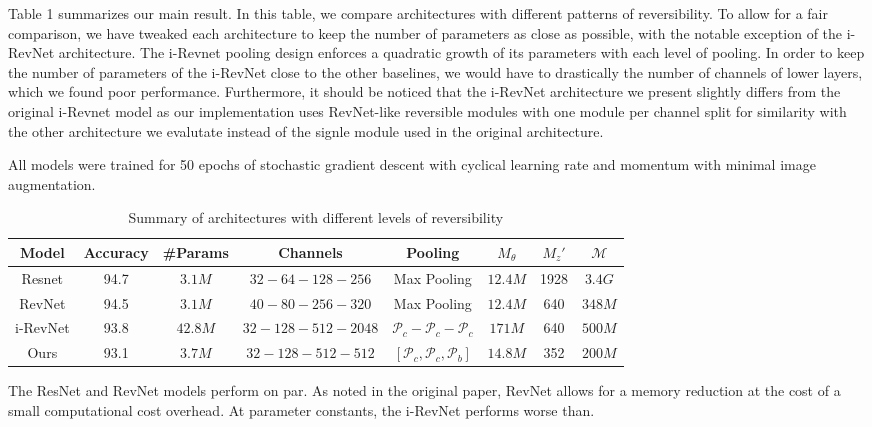 \documentclass[twocolumn]{bmcart}
\begin{document}
Table 1 summarizes our main result.
In this table, we compare architectures with different patterns of reversibility.
To allow for a fair comparison, we have tweaked each architecture to keep the number of parameters as close as possible,
with the notable exception of the i-RevNet architecture. 
The i-Revnet pooling design enforces a quadratic growth of its parameters with each level of pooling.
In order to keep the number of parameters of the i-RevNet close to the other baselines, we would have to drastically 
the number of channels of lower layers, which we found poor performance. 
Furthermore, it should be noticed that the i-RevNet architecture we present slightly differs from the original i-Revnet model
as our implementation uses RevNet-like reversible modules with one module per channel split for similarity with
the other architecture we evalutate instead of the signle module used in the original architecture.

All models were trained for 50 epochs of stochastic gradient descent with cyclical learning rate and momentum \cite{smith2017super} with minimal image augmentation.

\begin{table*}[t]
\begin{tabular}{ c c c c c c c c}	
Model     & Accuracy & \#Params & Channels & Pooling  & $M_{\theta}$ & $M_{z}'$ & $\mathcal{M} $ \\
\hline
Resnet    & 94.7   & $3.1M$   &  $32 - 64 - 128  - 256$       & Max Pooling      				         &  $12.4M$   &  1928  & $3.4G$  \\			
RevNet    & 94.5   & $3.1M$   &  $40 - 80 - 256  - 320$       & Max Pooling      				         &  $12.4M$   &  640   & $348M$  \\
i-RevNet  & 93.8   & $42.8M$  &  $32 - 128 - 512 - 2048$      & $\mathcal{P}_c - \mathcal{P}_c - \mathcal{P}_c$          &  $171M$    &  640   & $500M$  \\
Ours      & 93.1   & $3.7M$   &  $32 - 128 - 512 - 512$       & $[\mathcal{P}_c, \mathcal{P}_c, \mathcal{P}_b]$          &  $14.8M$   &  352   & $200M$  \\
\hline
\end{tabular}
\caption{Summary of architectures with different levels of reversibility}
\end{table*}

The ResNet and RevNet models perform on par.
As noted in the original paper, RevNet allows for a memory reduction at the cost of
a small computational cost overhead.
At parameter constants, the i-RevNet performs worse than.
\end{document}
